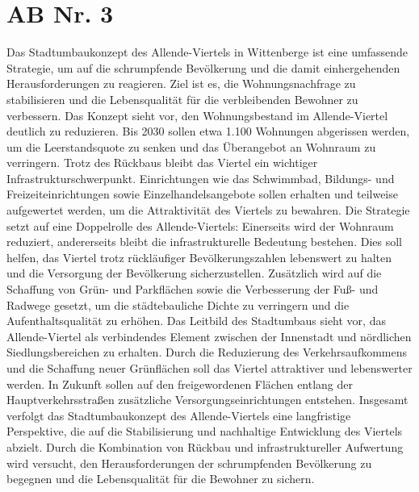 \documentclass[12pt,a4paper]{report}
\begin{document}
	\section{AB Nr. 3}
	Das Stadtumbaukonzept des Allende-Viertels in Wittenberge ist eine umfassende Strategie, um auf die schrumpfende Bevölkerung und die damit einhergehenden Herausforderungen zu reagieren.
	Ziel ist es, die Wohnungsnachfrage zu stabilisieren und die Lebensqualität für die verbleibenden Bewohner zu verbessern.
	Das Konzept sieht vor, den Wohnungsbestand im Allende-Viertel deutlich zu reduzieren.
	Bis 2030 sollen etwa 1.100 Wohnungen abgerissen werden, um die Leerstandsquote zu senken und das Überangebot an Wohnraum zu verringern.
	Trotz des Rückbaus bleibt das Viertel ein wichtiger Infrastrukturschwerpunkt.
	Einrichtungen wie das Schwimmbad, Bildungs- und Freizeiteinrichtungen sowie Einzelhandelsangebote sollen erhalten und teilweise aufgewertet werden, um die Attraktivität des Viertels zu bewahren.
	Die Strategie setzt auf eine Doppelrolle des Allende-Viertels: Einerseits wird der Wohnraum reduziert, andererseits bleibt die infrastrukturelle Bedeutung bestehen.
	Dies soll helfen, das Viertel trotz rückläufiger Bevölkerungszahlen lebenswert zu halten und die Versorgung der Bevölkerung sicherzustellen.
	Zusätzlich wird auf die Schaffung von Grün- und Parkflächen sowie die Verbesserung der Fuß- und Radwege gesetzt, um die städtebauliche Dichte zu verringern und die Aufenthaltsqualität zu erhöhen.
	Das Leitbild des Stadtumbaus sieht vor, das Allende-Viertel als verbindendes Element zwischen der Innenstadt und nördlichen Siedlungsbereichen zu erhalten.
	Durch die Reduzierung des Verkehrsaufkommens und die Schaffung neuer Grünflächen soll das Viertel attraktiver und lebenswerter werden.
	In Zukunft sollen auf den freigewordenen Flächen entlang der Hauptverkehrsstraßen zusätzliche Versorgungseinrichtungen entstehen.
	Insgesamt verfolgt das Stadtumbaukonzept des Allende-Viertels eine langfristige Perspektive, die auf die Stabilisierung und nachhaltige Entwicklung des Viertels abzielt.
	Durch die Kombination von Rückbau und infrastruktureller Aufwertung wird versucht, den Herausforderungen der schrumpfenden Bevölkerung zu begegnen und die Lebensqualität für die Bewohner zu sichern.
\end{document}
